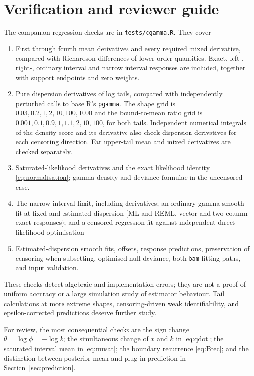 \documentclass[11pt,a4paper]{article}
\newcommand{\code}[1]{\texttt{#1}}
\begin{document}
\section{Verification and reviewer guide}
The companion regression checks are in \code{tests/cgamma.R}. They cover:
\begin{enumerate}
 \item First through fourth mean derivatives and every required mixed
 derivative, compared with Richardson differences of lower-order quantities.
 Exact, left-, right-, ordinary interval and narrow interval responses are
 included, together with support endpoints and zero weights.
 \item Pure dispersion derivatives of log tails, compared with independently
 perturbed calls to base R's \code{pgamma}. The shape grid is
 $0.03,0.2,1,2,10,100,1000$ and the bound-to-mean ratio grid is
 $0.001,0.1,0.9,1,1.1,2,10,100$, for both tails. Independent numerical integrals of the density score and its
 derivative also check dispersion derivatives for each censoring direction.
 Far upper-tail mean and mixed derivatives are checked separately.
 \item Saturated-likelihood derivatives and the exact likelihood identity
 \eqref{eq:normalisation}; gamma density and deviance formulae in the
 uncensored case.
 \item The narrow-interval limit, including derivatives; an ordinary gamma
 smooth fit at fixed and estimated dispersion (ML and REML, vector and
 two-column exact responses); and a censored regression fit against
 independent direct likelihood optimisation.
 \item Estimated-dispersion smooth fits, offsets, response predictions,
 preservation of censoring when subsetting, optimised null deviance, both
 \code{bam} fitting paths, and input validation.
\end{enumerate}
These checks detect algebraic and implementation errors; they are not a
proof of uniform accuracy or a large simulation study of estimator behaviour.
Tail calculations at more extreme shapes, censoring-driven weak
identifiability, and epsilon-corrected predictions deserve further study.

For review, the most consequential checks are the sign change
$\theta=\log\phi=-\log k$; the simultaneous change of $x$ and $k$ in
\eqref{eq:qdot}; the saturated interval mean in \eqref{eq:musat}; the
boundary recurrence \eqref{eq:Brec}; and the distinction between posterior
mean and plug-in prediction in Section~\ref{sec:prediction}.
\end{document}
